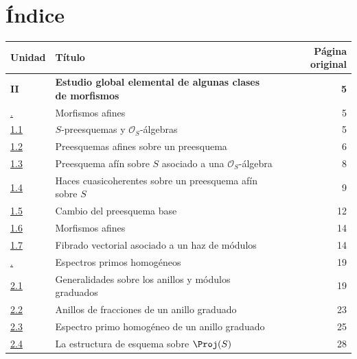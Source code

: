 \documentclass[oneside,10pt]{amsart}
\newcommand{\oldpage}[2][]{\marginnote{\normalfont\footnotesize\textbf{#1}~|~#2}\ignorespaces}
\begin{document}

\endgroup

\clearpage
\oldpage[II]{212}
\thispagestyle{empty}
\mbox{}

\clearpage
\oldpage[II]{213}
{}
\section*{Índice}
\thispagestyle{plain}

\begingroup
\small
\renewcommand{\arraystretch}{1.04}
\begin{longtable}{@{}p{}p{}r@{}}
\textbf{Unidad} & \textbf{Título} & \textbf{Página original}\\
\hline
\textbf{II} & \textbf{Estudio global elemental de algunas clases de morfismos} & \textbf{5}\\
\hyperref[section:II.1-fr]{\textsection1.} & Morfismos afines & 5\\
\hyperref[subsection:II.1.1-fr]{1.1} & $S$-preesquemas y $\mathcal{O}_S$-álgebras & 5\\
\hyperref[subsection:II.1.2-fr]{1.2} & Preesquemas afines sobre un preesquema & 6\\
\hyperref[subsection:II.1.3-fr]{1.3} & Preesquema afín sobre $S$ asociado a una $\mathcal{O}_S$-álgebra & 8\\
\hyperref[subsection:II.1.4-fr]{1.4} & Haces cuasicoherentes sobre un preesquema afín sobre $S$ & 9\\
\hyperref[II.1.5-fr]{1.5} & Cambio del preesquema base & 12\\
\hyperref[II.1.6-fr]{1.6} & Morfismos afines & 14\\
\hyperref[II.1.7-fr]{1.7} & Fibrado vectorial asociado a un haz de módulos & 14\\
\hyperref[section:II.2-fr]{\textsection2.} & Espectros primos homogéneos & 19\\
\hyperref[subsection:II.2.1-fr]{2.1} & Generalidades sobre los anillos y módulos graduados & 19\\
\hyperref[subsection:II.2.2-fr]{2.2} & Anillos de fracciones de un anillo graduado & 23\\
\hyperref[subsection:II.2.3-fr]{2.3} & Espectro primo homogéneo de un anillo graduado & 25\\
\hyperref[subsection:II.2.4-fr]{2.4} & La estructura de esquema sobre $\Proj(S)$ & 28\\

\end{longtable}
\end{document}

